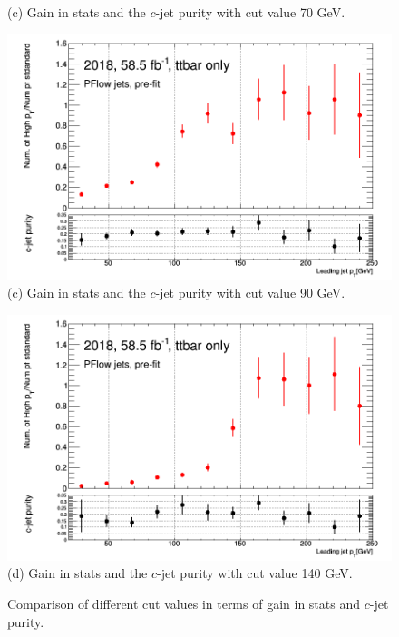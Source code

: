 \documentclass[letterpaper,12pt]{article}
\begin{document}
\begin{figure}
\begin{minipage}[b]{.45\textwidth}
\footnotesize (c) Gain in stats and the $c$-jet purity with cut value 70 GeV.
\end{minipage}\hfill
\begin{minipage}[b]{.45\textwidth}
\centering
\includegraphics[width=1\textwidth]{stat_gains/statsgain_90GeV.png}
\footnotesize (c) Gain in stats and the $c$-jet purity with cut value 90 GeV.
\end{minipage}\hfill
\begin{minipage}[b]{.45\textwidth}
\centering
\includegraphics[width=1\textwidth]{stat_gains/statsgain_140GeV.png}
\footnotesize (d) Gain in stats and the $c$-jet purity with cut value 140 GeV.
\end{minipage}\hfill

\caption{Comparison of different cut values in terms of gain in stats and $c$-jet purity.}
\label{fig:cutvalue}
\end{figure}
\end{document}
